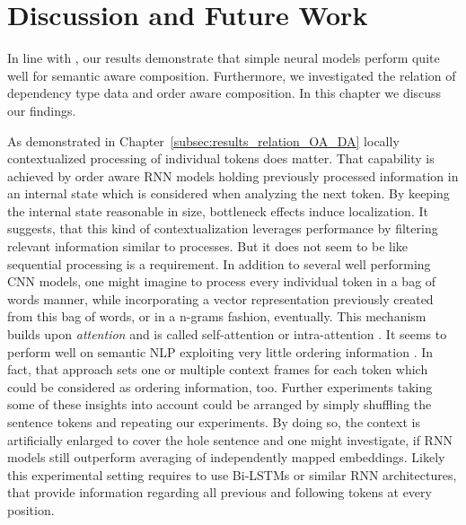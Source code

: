 \section{Discussion and Future Work}

In line with \textcite{mueller_siamese_2016,iyyer_deep_2015}, our results demonstrate that simple neural models perform quite well for semantic aware composition. Furthermore, we investigated the relation of dependency type data and order aware composition. In this chapter we discuss our findings.%

As demonstrated in Chapter~\ref{subsec:results_relation_OA_DA} locally contextualized processing of individual tokens does matter. That capability is achieved by order aware \ac{RNN} models holding previously processed information in an internal state which is considered when analyzing the next token. By keeping the internal state reasonable in size, bottleneck effects induce localization. It suggests, that this kind of contextualization leverages performance by filtering relevant information similar to processes. %
But it does not seem to be like sequential processing is a requirement. In addition to several well performing \ac{CNN} models, one might imagine to process every individual token in a bag of words manner, while incorporating a vector representation previously created from this bag of words, or in a n-grams fashion, eventually. This mechanism builds upon \textit{attention} \autocite{bahdanau_neural_2014, vaswani_attention_2017} and is called self-attention or intra-attention \autocite{cheng_long_2016}. It seems to perform well on semantic \ac{NLP} exploiting very little %
ordering information \autocite{parikh_decomposable_2016}. In fact, that approach sets one or multiple context frames for each token which could be considered as ordering information, too. %
Further experiments taking some of these insights into account could be arranged by simply shuffling the sentence tokens and repeating our experiments. By doing so, the context is artificially enlarged to cover the hole sentence and one might investigate, if \ac{RNN} models still outperform averaging of independently mapped embeddings. Likely this experimental setting requires to use Bi-LSTMs \autocite{graves_speech_2013} or similar \ac{RNN} architectures, that provide information regarding all previous and following tokens at every position. 

